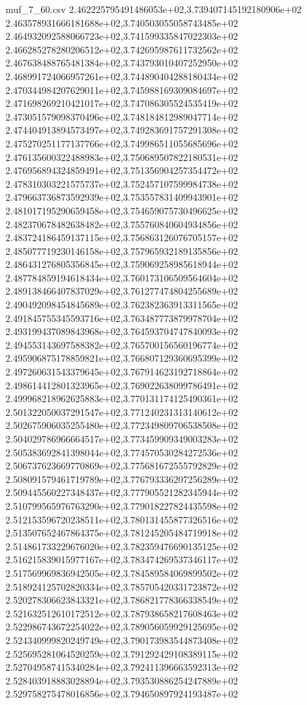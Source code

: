 \begin{filecontents*}{muf_7_60.csv}
2.462225795491486053e+02,3.739407145192180906e+02
2.463578931666181688e+02,3.740503055058743485e+02
2.464932092588066723e+02,3.741599335847022303e+02
2.466285278280206512e+02,3.742695987611732562e+02
2.467638488765481384e+02,3.743793010407252950e+02
2.468991724066957261e+02,3.744890404288180434e+02
2.470344984207629011e+02,3.745988169309084697e+02
2.471698269210421017e+02,3.747086305524535419e+02
2.473051579098370496e+02,3.748184812989047714e+02
2.474404913894573497e+02,3.749283691757291308e+02
2.475270251177137766e+02,3.749986511055685696e+02
2.476135600322488983e+02,3.750689507822180531e+02
2.476956894324859491e+02,3.751356904257354472e+02
2.478310303221575737e+02,3.752457107599984738e+02
2.479663736873592939e+02,3.753557831409943901e+02
2.481017195290659458e+02,3.754659075730496625e+02
2.482370678482638482e+02,3.755760840604934856e+02
2.483724186459137115e+02,3.756863126076705157e+02
2.485077719230146158e+02,3.757965932189135856e+02
2.486431276805356845e+02,3.759069258985618944e+02
2.487784859194618434e+02,3.760173106509564604e+02
2.489138466407837029e+02,3.761277474804255689e+02
2.490492098454845689e+02,3.762382363913311565e+02
2.491845755345593716e+02,3.763487773879978704e+02
2.493199437089843968e+02,3.764593704747840093e+02
2.494553143697588382e+02,3.765700156560196774e+02
2.495906875178859821e+02,3.766807129360695399e+02
2.497260631543379645e+02,3.767914623192718864e+02
2.498614412801323965e+02,3.769022638099786491e+02
2.499968218962625883e+02,3.770131174125490361e+02
2.501322050037291547e+02,3.771240231313140612e+02
2.502675906035255480e+02,3.772349809706538508e+02
2.504029786966664517e+02,3.773459909349003283e+02
2.505383692841398044e+02,3.774570530284272536e+02
2.506737623669770869e+02,3.775681672555792829e+02
2.508091579461719789e+02,3.776793336207256289e+02
2.509445560227348437e+02,3.777905521282345944e+02
2.510799565976763290e+02,3.779018227824435598e+02
2.512153596720238511e+02,3.780131455877326516e+02
2.513507652467864375e+02,3.781245205484719918e+02
2.514861733229676020e+02,3.782359476690135125e+02
2.516215839015977167e+02,3.783474269537346117e+02
2.517569969836942505e+02,3.784589584069899502e+02
2.518924125702820334e+02,3.785705420331723872e+02
2.520278306623843321e+02,3.786821778366338549e+02
2.521632512610172512e+02,3.787938658217608463e+02
2.522986743672254022e+02,3.789056059929125695e+02
2.524340999820249749e+02,3.790173983544873408e+02
2.525695281064520259e+02,3.791292429108389115e+02
2.527049587415340284e+02,3.792411396663592313e+02
2.528403918883028894e+02,3.793530886254247889e+02
2.529758275478016856e+02,3.794650897924193487e+02

\end{filecontents*}
